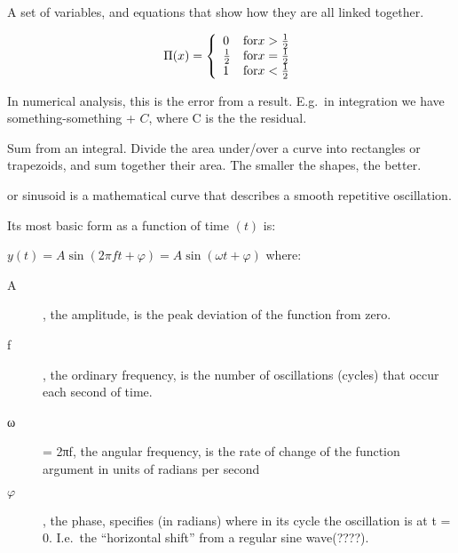 \begin{definition}
    A set of variables, and equations that show how they are all linked 
    together.
\end{definition}

\begin{definition}
    $$
    \Pi(x) = \left\{
            \begin{array}{l l}
                0 & \text{for} x > \frac{1}{2} \\
                \frac{1}{2} & \text{for} x = \frac{1}{2} \\
                1 & \text{for} x < \frac{1}{2} \\
            \end{array}
        \right.
    $$
\end{definition}

\begin{definition}[Residual]
    In numerical analysis, this is the error from a result.
    E.g.\ in integration we have something-something + $C$, where C is the 
    the residual.

\end{definition}

\begin{definition}
    Sum from an integral. Divide the area under/over a curve into rectangles
    or trapezoids, and sum together their area. The smaller the shapes, the
    better.
\end{definition}

\begin{definition}
or sinusoid is a mathematical curve that describes a smooth repetitive
oscillation.

Its most basic form as a function of time $(t)$ is:

$y(t) = A\sin(2 \pi f t + \varphi) = A\sin(\omega t + \varphi)$
where:
\begin{description}
    \item[A], the amplitude, is the peak deviation of the function from zero.
    \item[f], the ordinary frequency, is the number of oscillations (cycles)
        that occur each second of time.
    \item[ω] = 2πf, the angular frequency, is the rate of change of the
    function argument in units of radians per second 
    \item[$\varphi$], the phase, specifies (in radians) where in its cycle the
        oscillation is at t = 0. I.e.\ the ``horizontal shift'' from a regular
        sine wave(????).
\end{description}

\end{definition}


